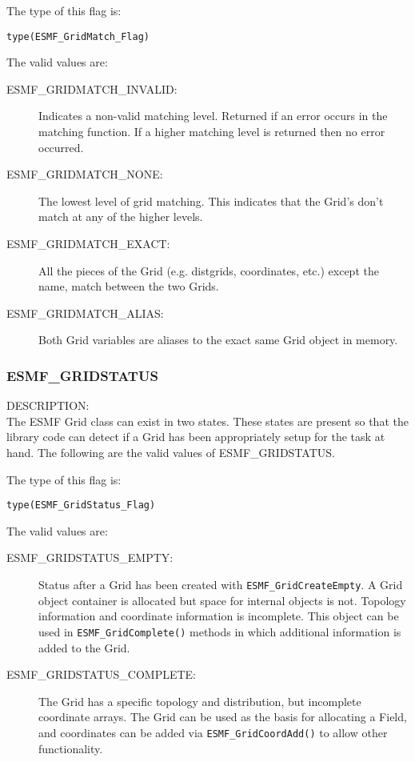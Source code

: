 The type of this flag is:

{\tt type(ESMF\_GridMatch\_Flag)}

The valid values are:
\begin{description}
\item [ESMF\_GRIDMATCH\_INVALID:] Indicates a non-valid matching level. Returned
      if an error occurs in the matching function. If a higher matching level
      is returned then no error occurred.
\item [ESMF\_GRIDMATCH\_NONE:] The lowest level of grid matching. 
      This indicates that the Grid's don't match at any of the higher levels. 
\item [ESMF\_GRIDMATCH\_EXACT:] All the pieces of the Grid (e.g. distgrids, 
      coordinates, etc.) except the name, match between the two Grids. 
\item [ESMF\_GRIDMATCH\_ALIAS:] Both Grid variables are aliases to the exact
      same Grid object in memory. 
\end{description}


\subsubsection{ESMF\_GRIDSTATUS}
\label{const:gridstatus}

{\sf DESCRIPTION:\\}
The ESMF Grid class can exist in two states. These states are
present so that the library code can detect if a Grid has been
appropriately setup for the task at hand. The following
are the valid values of ESMF\_GRIDSTATUS.

The type of this flag is:

{\tt type(ESMF\_GridStatus\_Flag)}

The valid values are:
\begin{description}
\item [ESMF\_GRIDSTATUS\_EMPTY:] Status after a Grid has been created with 
      {\tt ESMF\_GridCreateEmpty}.  A Grid object container is allocated but
      space for internal objects is not.  Topology information and coordinate
      information is incomplete.  This object can be used in {\tt ESMF\_GridComplete()}
      methods in which additional information is added to the Grid.
\item [ESMF\_GRIDSTATUS\_COMPLETE:] The Grid has a specific topology and
      distribution, but incomplete coordinate arrays.  The Grid can be used
      as the basis for allocating a Field, and coordinates can be added
      via {\tt ESMF\_GridCoordAdd()} to allow other functionality. 
\end{description}


